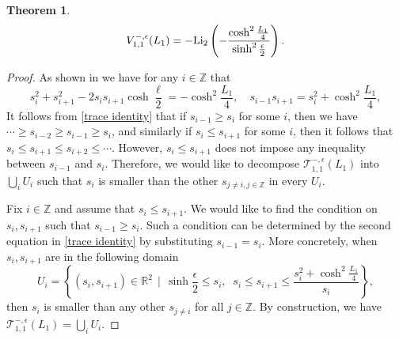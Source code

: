 \documentclass[12pt]{amsart}
\theoremstyle{plain}
\newtheorem{theorem}{Theorem}[section]
\theoremstyle{definition}
\theoremstyle{remark}
\numberwithin{equation}{section}
\begin{document}
\begin{theorem}\label{thm:KB}
\begin{equation}
V_{1,1}^{-,\epsilon}(L_1)=-{\rm Li}_2\left(-\frac{\cosh^2\frac{L_1}{4}}{\sinh^2\frac{\epsilon}{2}}\right).
\end{equation}
\end{theorem}
\begin{proof}
As shown in \cite{Nor07} we have for any $i\in\mathbb{Z}$ that
\begin{equation}
s_i^2+s_{i+1}^2-2s_is_{i+1}\cosh\frac{\ell}{2}=-\cosh^2\frac{L_1}{4},\quad s_{i-1}s_{i+1}=s_i^2+\cosh^2\frac{L_1}{4},\label{trace identity}
\end{equation}
It follows from \eqref{trace identity} that if $s_{i-1}\geq s_{i}$ for some $i$, then we have  $\cdots\geq s_{i-2}\geq s_{i-1}\geq s_{i}$, and similarly if $s_{i}\leq s_{i+1}$ for some $i$, then it follows that  $s_{i}\leq s_{i+1}\leq s_{i+2}\leq\cdots$. However, $s_{i}\leq s_{i+1}$ does not impose any inequality between $s_{i-1}$ and $s_{i}$. Therefore, we would like to decompose $\mathcal{T}_{1,1}^{-,\epsilon}(L_1)$ into $\bigcup_i U_i$ such that $s_i$ is smaller than the other $s_{j\neq i,j\in\mathbb{Z}}$ in every $U_i$.

Fix $i\in\mathbb{Z}$ and assume that $s_i\leq s_{i+1}$. We would like to find the condition on $s_i,s_{i+1}$ such that $s_{i-1}\geq s_i$. Such a condition can be determined by the second equation in \eqref{trace identity} by substituting $s_{i-1}=s_i$. More concretely, when $s_i,s_{i+1}$ are in the following domain
\begin{equation*}
U_i=\left\{(s_i,s_{i+1})\in\mathbb{R}^2\,\;\Big|\;\,\sinh\frac{\epsilon}{2}\leq s_i,\;\; s_i\leq s_{i+1}\leq \frac{s_i^2+\cosh^2\frac{L_1}{4}}{s_i}\right\},
\end{equation*}
then $s_i$ is smaller than any other $s_{j\neq i}$ for all $j\in\mathbb{Z}$. By construction, we have $\mathcal{T}_{1,1}^{-,\epsilon}(L_1)=\bigcup_i U_i$.



\end{proof}
\end{document}
